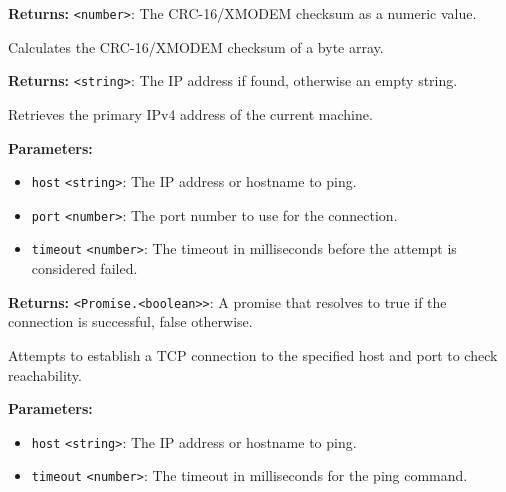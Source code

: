 \documentclass[12pt,a4paper]{article}
\begin{document}
\noindent \textbf{Returns:} \texttt{<number>}: The CRC-16/XMODEM checksum as a numeric value.

\noindent Calculates the CRC-16/XMODEM checksum of a byte array.

\vspace{5mm}
\noindent {}


\noindent \textbf{Returns:} \texttt{<string>}: The IP address if found, otherwise an empty string.

\noindent Retrieves the primary IPv4 address of the current machine.

\vspace{5mm}
\noindent {}


\noindent \textbf{Parameters:}
\begin{itemize}
  \item \texttt{host} \texttt{<string>}: The IP address or hostname to ping.
  \item \texttt{port} \texttt{<number>}: The port number to use for the connection.
  \item \texttt{timeout} \texttt{<number>}: The timeout in milliseconds before the attempt is considered failed.
\end{itemize}

\noindent \textbf{Returns:} \texttt{<Promise.<boolean>>}: A promise that resolves to \textasciigrave{}true\textasciigrave{} if the connection is successful, \textasciigrave{}false\textasciigrave{} otherwise.

\noindent Attempts to establish a TCP connection to the specified host and port to check reachability.

\vspace{5mm}
\noindent {}


\noindent \textbf{Parameters:}
\begin{itemize}
  \item \texttt{host} \texttt{<string>}: The IP address or hostname to ping.
  \item \texttt{timeout} \texttt{<number>}: The timeout in milliseconds for the ping command.
\end{itemize}
\end{document}
